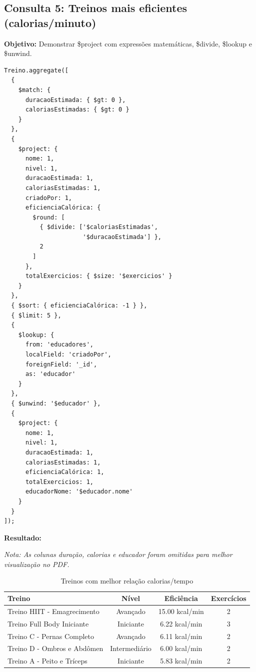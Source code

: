 \documentclass[12pt,a4paper]{article}
\begin{document}
\subsection{Consulta 5: Treinos mais eficientes (calorias/minuto)}

\textbf{Objetivo:} Demonstrar \$project com expressões matemáticas, \$divide, \$lookup e \$unwind.

\begin{lstlisting}[caption=Query 5 - Cálculos com Expressões]
Treino.aggregate([
  {
    $match: {
      duracaoEstimada: { $gt: 0 },
      caloriasEstimadas: { $gt: 0 }
    }
  },
  {
    $project: {
      nome: 1,
      nivel: 1,
      duracaoEstimada: 1,
      caloriasEstimadas: 1,
      criadoPor: 1,
      eficienciaCalórica: {
        $round: [
          { $divide: ['$caloriasEstimadas', 
                      '$duracaoEstimada'] }, 
          2
        ]
      },
      totalExercicios: { $size: '$exercicios' }
    }
  },
  { $sort: { eficienciaCalórica: -1 } },
  { $limit: 5 },
  {
    $lookup: {
      from: 'educadores',
      localField: 'criadoPor',
      foreignField: '_id',
      as: 'educador'
    }
  },
  { $unwind: '$educador' },
  {
    $project: {
      nome: 1,
      nivel: 1,
      duracaoEstimada: 1,
      caloriasEstimadas: 1,
      eficienciaCalórica: 1,
      totalExercicios: 1,
      educadorNome: '$educador.nome'
    }
  }
]);
\end{lstlisting}

\textbf{Resultado:}

\textit{Nota: As colunas duração, calorias e educador foram omitidas para melhor visualização no PDF.}

\begin{table}[h]
\centering
\small
\begin{tabular}{lccc}
\toprule
Treino & Nível & Eficiência & Exercícios \\
\midrule
Treino HIIT - Emagrecimento & Avançado & 15.00 kcal/min & 2 \\
Treino Full Body Iniciante & Iniciante & 6.22 kcal/min & 3 \\
Treino C - Pernas Completo & Avançado & 6.11 kcal/min & 2 \\
Treino D - Ombros e Abdômen & Intermediário & 6.00 kcal/min & 2 \\
Treino A - Peito e Tríceps & Iniciante & 5.83 kcal/min & 2 \\
\bottomrule
\end{tabular}
\caption{Treinos com melhor relação calorias/tempo}
\end{table}
\end{document}
